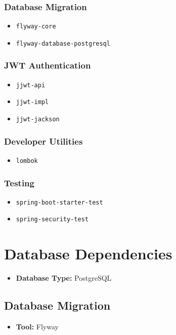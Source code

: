 \documentclass[a4paper,11pt]{article}
\begin{document}
\subsubsection*{Database Migration}
\begin{itemize}
    \item \texttt{flyway-core}
    \item \texttt{flyway-database-postgresql}
\end{itemize}

\subsubsection*{JWT Authentication}
\begin{itemize}
    \item \texttt{jjwt-api}
    \item \texttt{jjwt-impl}
    \item \texttt{jjwt-jackson}
\end{itemize}

\subsubsection*{Developer Utilities}
\begin{itemize}
    \item \texttt{lombok}
\end{itemize}

\subsubsection*{Testing}
\begin{itemize}
    \item \texttt{spring-boot-starter-test}
    \item \texttt{spring-security-test}
\end{itemize}

\section{Database Dependencies}

\begin{itemize}
    \item \textbf{Database Type:} PostgreSQL
\end{itemize}

\subsection{Database Migration}
\begin{itemize}
    \item \textbf{Tool:} Flyway
\end{itemize}
\end{document}
